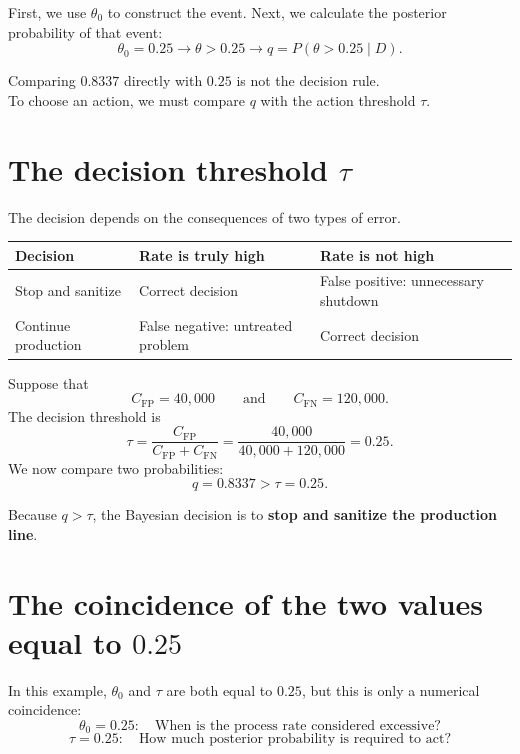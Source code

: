 \documentclass[11pt,letter]{article}
\newcommand{\CFP}{C_{\mathrm{FP}}}
\newcommand{\CFN}{C_{\mathrm{FN}}}
\begin{document}
First, we use $\theta_0$ to construct the event. Next, we calculate the
posterior probability of that event:
\[
\theta_0=0.25
\longrightarrow
\theta>0.25
\longrightarrow
q=P(\theta>0.25\mid D).
\]

\begin{atencao}
Comparing $0.8337$ directly with $0.25$ is not the decision rule.\\
To choose an action, we must compare $q$ with the action threshold $\tau$.
\end{atencao}
\section{The decision threshold $\tau$}

The decision depends on the consequences of two types of error.

\begin{center}
\begin{tabular}{p{3.8cm}p{4.8cm}p{4.8cm}}
\toprule
Decision & Rate is truly high & Rate is not high \\
\midrule
Stop and sanitize
& Correct decision
& False positive: unnecessary shutdown \\
Continue production
& False negative: untreated problem
& Correct decision \\
\bottomrule
\end{tabular}
\end{center}

Suppose that
\[
\CFP=40{,}000
\qquad\text{and}\qquad
\CFN=120{,}000.
\]
The decision threshold is
\[
\tau
=\frac{\CFP}{\CFP+\CFN}
=\frac{40{,}000}{40{,}000+120{,}000}
=0.25.
\]
We now compare two probabilities:
\[
q=0.8337>\tau=0.25.
\]

\begin{ideia}
Because $q>\tau$, the Bayesian decision is to \textbf{stop and sanitize the
production line}.
\end{ideia}

\section{The coincidence of the two values equal to $0.25$}

In this example, $\theta_0$ and $\tau$ are both equal to $0.25$, but this is
only a numerical coincidence:
\[
\theta_0=0.25:
\quad
\text{When is the process rate considered excessive?}
\]
\[
\tau=0.25:
\quad
\text{How much posterior probability is required to act?}
\]
\end{document}
